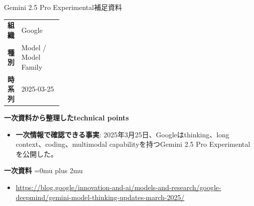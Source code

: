 \begin{technicalnote}{Gemini 2.5 Pro Experimental}{補足資料}
\begingroup
\begin{tabularx}{\linewidth}{@{}>{\bfseries}p{0.22\linewidth}X@{}}
組織 & Google \\
種別 & Model / Model Family \\
時系列 & 2025-03-25 \\
\end{tabularx}
\smallskip
\begin{minipage}{\linewidth}
{\bfseries 一次資料から整理したtechnical points}
\begin{itemize}[leftmargin=1.5em,itemsep=0.35em]
\item \textbf{一次情報で確認できる事実}: 2025年3月25日、Googleはthinking、long context、coding、multimodal capabilityを持つGemini 2.5 Pro Experimentalを公開した。
\end{itemize}
\begin{samepage}
{\bfseries 一次資料}
\begingroup\sloppy
\Urlmuskip=0mu plus 2mu\relax
\begin{itemize}[leftmargin=1.5em,itemsep=0.25em]
\item {\scriptsize\url{https://blog.google/innovation-and-ai/models-and-research/google-deepmind/gemini-model-thinking-updates-march-2025/}}
\end{itemize}
\endgroup
\end{samepage}
\end{minipage}
\endgroup
\end{technicalnote}
\medskip

